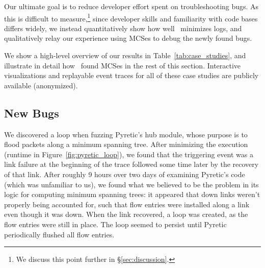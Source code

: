 Our ultimate goal is to reduce developer effort spent on troubleshooting bugs.
As this is difficult to measure,\footnote{We discuss this point further in
\S\ref{sec:discussion}.} since developer skills and
familiarity with code bases differs widely, we instead
quantitatively show how well \projectname~minimizes logs,
and qualitatively relay our experience using MCSes to debug the newly found bugs.


We show a high-level overview
of our results in Table~\ref{tab:case_studies}, and
illustrate in detail how \projectname~found MCSes
in the rest of this section. Interactive visualizations and replayable event traces
for all of these case studies are publicly available (anonymized).

\subsection{New Bugs}

 We discovered a loop when fuzzing Pyretic's hub
module, whose purpose is to flood packets along a minimum spanning tree. After
minimizing the execution (runtime in Figure~\ref{fig:pyretic_loop}), we found that the triggering event
was a link failure at the beginning of the trace followed some time later by
the recovery of that link. After roughly 9 hours over two days of examining
Pyretic's code (which was unfamiliar to us), we found what we believed to be the problem
in its logic for computing minimum spanning trees: it appeared that down links
weren't properly being accounted for, such that flow entries were installed
along a link even though it was down. When the link recovered, a loop was
created, as the flow entries were still in place. The loop seemed to persist until
Pyretic periodically flushed all flow entries.


